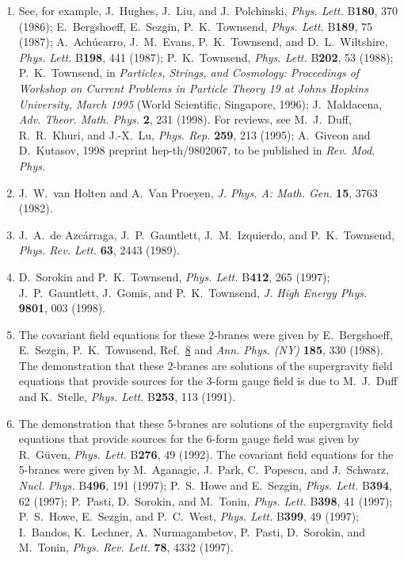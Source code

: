 \begin{enumerate}
  \item {}\label{ch32-ref-8}
  See, for example, J.~Hughes, J.~Liu, and J.~Polchinski,
  \textit{Phys. Lett.} B\textbf{180}, 370 (1986); E.~Bergshoeff,
  E.~Sezgin, P.~K.~Townsend, \textit{Phys. Lett.} B\textbf{189}, 75
  (1987); A.~Ach\'ucarro, J.~M.~Evans, P.~K.~Townsend, and
  D.~L.~Wiltshire, \textit{Phys. Lett.} B\textbf{198}, 441 (1987);
  P.~K.~Townsend, \textit{Phys. Lett.} B\textbf{202}, 53 (1988);
  P.~K.~Townsend, in \textit{Particles, Strings, and Cosmology:
  Proceedings of Workshop on Current Problems in Particle Theory 19
  at Johns Hopkins University, March 1995} (World Scientific,
  Singapore, 1996); J.~Maldacena, \textit{Adv. Theor. Math. Phys.}
  \textbf{2}, 231 (1998). For reviews, see M.~J.~Duff, R.~R.~Khuri,
  and J.-X.~Lu, \textit{Phys. Rep.} \textbf{259}, 213 (1995);
  A.~Giveon and D.~Kutasov, 1998 preprint hep-th/9802067, to be
  published in \textit{Rev. Mod. Phys.}

  \item {}\label{ch32-ref-9}
  J.~W.~van Holten and A.~Van Proeyen, \textit{J. Phys. A: Math. Gen.}
  \textbf{15}, 3763 (1982).

  \item {}\label{ch32-ref-10}
  J.~A.~de Azc\'arraga, J.~P.~Gauntlett, J.~M.~Izquierdo, and
  P.~K.~Townsend, \textit{Phys. Rev. Lett.} \textbf{63}, 2443 (1989).

  \item {}\label{ch32-ref-11}
  D.~Sorokin and P.~K.~Townsend, \textit{Phys. Lett.} B\textbf{412},
  265 (1997); J.~P.~Gauntlett, J.~Gomis, and P.~K.~Townsend,
  \textit{J. High Energy Phys.} \textbf{9801}, 003 (1998).

  \item {}\label{ch32-ref-12}
  The covariant field equations for these 2-branes were given by
  E.~Bergshoeff, E.~Sezgin, P.~K.~Townsend,
  Ref.~\hyperref[ch32-ref-8]{8} and \textit{Ann. Phys. (NY)}
  \textbf{185}, 330 (1988). The demonstration that these 2-branes are
  solutions of the supergravity field equations that provide sources
  for the 3-form gauge field is due to M.~J.~Duff and K.~Stelle,
  \textit{Phys. Lett.} B\textbf{253}, 113 (1991).

  \item {}\label{ch32-ref-13}
  The demonstration that these 5-branes are solutions of the
  supergravity field equations that provide sources for the 6-form
  gauge field was given by R.~G\"uven, \textit{Phys. Lett.}
  B\textbf{276}, 49 (1992). The covariant field equations for the
  5-branes were given by M.~Aganagic, J.~Park, C.~Popescu, and
  J.~Schwarz, \textit{Nucl. Phys.} B\textbf{496}, 191 (1997);
  P.~S.~Howe and E.~Sezgin, \textit{Phys. Lett.} B\textbf{394}, 62
  (1997); P.~Pasti, D.~Sorokin, and M.~Tonin, \textit{Phys. Lett.}
  B\textbf{398}, 41 (1997); P.~S.~Howe, E.~Sezgin, and P.~C.~West,
  \textit{Phys. Lett.} B\textbf{399}, 49 (1997); I.~Bandos,
  K.~Lechner, A.~Nurmagambetov, P.~Pasti, D.~Sorokin, and M.~Tonin,
  \textit{Phys. Rev. Lett.} \textbf{78}, 4332 (1997).
\end{enumerate}
